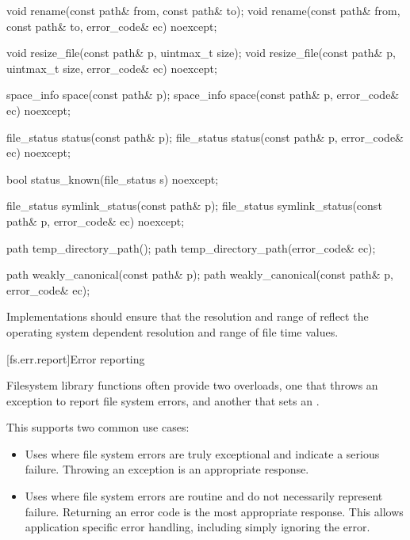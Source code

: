 \begin{codeblock}
{  void rename(const path& from, const path& to);
  void rename(const path& from, const path& to, error_code& ec) noexcept;

  void resize_file(const path& p, uintmax_t size);
  void resize_file(const path& p, uintmax_t size, error_code& ec) noexcept;

  space_info space(const path& p);
  space_info space(const path& p, error_code& ec) noexcept;

  file_status status(const path& p);
  file_status status(const path& p, error_code& ec) noexcept;

  bool status_known(file_status s) noexcept;

  file_status symlink_status(const path& p);
  file_status symlink_status(const path& p, error_code& ec) noexcept;

  path temp_directory_path();
  path temp_directory_path(error_code& ec);

  path weakly_canonical(const path& p);
  path weakly_canonical(const path& p, error_code& ec);
}
\end{codeblock}

\pnum
Implementations should ensure that the resolution and range of
 reflect the operating system dependent resolution and range
of file time values.

[fs.err.report]{Error reporting}

\pnum
Filesystem library functions often provide two overloads, one that
throws an exception to report file system errors, and another that sets an .
\begin{note} This supports two common use cases:
\begin{itemize}
\item
Uses where file system errors are truly exceptional
and indicate a serious failure.
Throwing an exception is an appropriate response.
\item
Uses where file system errors are routine
and do not necessarily represent failure.
Returning an error code is the most appropriate response.
This allows application specific error handling, including simply ignoring the error.
\end{itemize}
\end{note}

